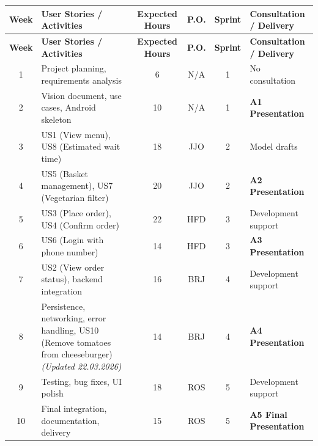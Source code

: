 \documentclass{article}
\begin{document}
\begin{longtable}{|c|>{\raggedright\arraybackslash}p{5.2cm}|c|c|c|>{\raggedright\arraybackslash}p{3.3cm}|}
    \hline
    \textbf{Week} & \textbf{User Stories / Activities} & \textbf{Expected Hours} & \textbf{P.O.} & \textbf{Sprint} & \textbf{Consultation / Delivery}\\
    \hline
    \endfirsthead

    \hline
    \textbf{Week} & \textbf{User Stories / Activities} & \textbf{Expected Hours} & \textbf{P.O.} & \textbf{Sprint} & \textbf{Consultation / Delivery}\\
    \hline
    \endhead

    1 & Project planning, requirements analysis & 6 & N/A & 1 & No consultation\\
    \hline
    2 & Vision document, use cases, Android skeleton & 10 & N/A & 1 & \textbf{A1 Presentation}\\
    \hline
    3 & US1 (View menu), US8 (Estimated wait time) & 18 & JJO & 2 & Model drafts\\
    \hline
    4 & US5 (Basket management), US7 (Vegetarian filter) & 20 & JJO & 2 & \textbf{A2 Presentation}\\
    \hline
    5 & US3 (Place order), US4 (Confirm order) & 22 & HFD & 3 & Development support\\
    \hline
    6 & US6 (Login with phone number) & 14 & HFD & 3 & \textbf{A3 Presentation}\\
    \hline
    7 & US2 (View order status), backend integration & 16 & BRJ & 4 & Development support\\
    \hline
    8 & Persistence, networking, error handling, US10 (Remove tomatoes from cheeseburger) \textit{(Updated 22.03.2026)} & 14 & BRJ & 4 & \textbf{A4 Presentation}\\
    \hline
    9 & Testing, bug fixes, UI polish & 18 & ROS & 5 & Development support\\
    \hline
    10 & Final integration, documentation, delivery & 15 & ROS & 5 & \textbf{A5 Final Presentation}\\
    \hline
\end{longtable}
\end{document}
